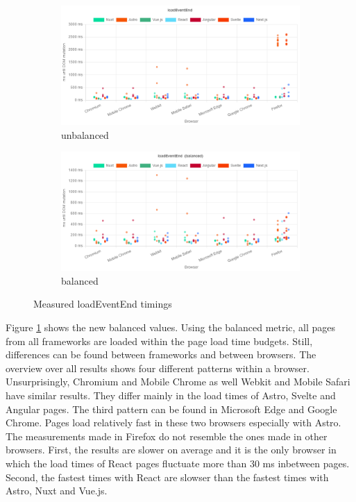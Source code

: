 \documentclass[a4paper, 12pt]{article}
\begin{document}
\begin{figure}
  \centering
  \begin{subfigure}{\linewidth}
    \includegraphics[width=\linewidth, keepaspectratio]{img/playwright-results/loadEventEnd/total.png}
    \caption{unbalanced}\label{subfig:Playwright:loadEventEnd:unbalanced}
  \end{subfigure}
  \begin{subfigure}{\linewidth}
    \includegraphics[width=\linewidth, keepaspectratio]{img/playwright-results/loadEventEnd_balanced/total.png}
    \caption{balanced}\label{subfig:Playwright:loadEventEnd:balanced}
  \end{subfigure}
  \caption{Measured loadEventEnd timings}
  \label{fig:Playwright:loadEventEnd}
\end{figure}

Figure \ref{subfig:Playwright:loadEventEnd:unbalanced} shows the new balanced values.
Using the balanced metric, all pages from all frameworks are loaded within the page load time budgets.
Still, differences can be found between frameworks and between browsers.
The overview over all results shows four different patterns within a browser.
Unsurprisingly, Chromium and Mobile Chrome as well Webkit and Mobile Safari have similar results.
They differ mainly in the load times of Astro, Svelte and Angular pages.
The third pattern can be found in Microsoft Edge and Google Chrome.
Pages load relatively fast in these two browsers especially with Astro.
The measurements made in Firefox do not resemble the ones made in other browsers.
First, the results are slower on average and it is the only browser in which the load times of React pages fluctuate more than 30 ms inbetween pages.
Second, the fastest times with React are slowser than the fastest times with Astro, Nuxt and Vue.js.
\end{document}

